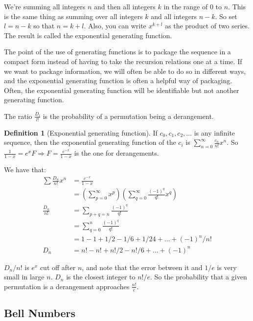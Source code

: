\documentclass[12pt]{article}
\theoremstyle{definition}
\newtheorem{defn}{Definition}
\begin{document}
We're summing all integers $n$ and then all integers $k$ in the range of 0 to
$n$. This is the same thing as summing over all integers $k$ and all integers
$n-k$. So set $l = n-k$ so that $n = k+l$. Also, you can write $x^{k + l}$ as
the product of two series. The result is called the exponential generating
function.

The point of the use of generating functions is to package the sequence in a
compact form instead of having to take the recursion relations one at a time.
If we want to package information, we will often be able to do so in different
ways, and the exponential generating function is often a helpful way of
packaging. Often, the exponential generating function will be identifiable but
not another generating function.

The ratio $\frac{D_l}{ l!}$ is the probability of a permutation being a
derangement. 

\begin{defn}[Exponential generating function]
    If $c_0, c_1, c_2, \ldots$ is any infinite sequence, then the exponential
    generating function of the $c_i$ is $\sum_{n=0}^\infty \frac{c_n}{n!}x^n$.
    So $\frac{1}{1-x} = e^x F \Rightarrow F = \frac{e^{-x}}{1-x}$ is the one
    for derangements.
\end{defn}

We have that:
\begin{align*}
    \sum \frac{D_n}{n!} x^n &= \frac{e^{-x}}{1-x} \\
    &= \left(\sum_{p=0}^\infty x^p\right)\left(\sum_{q=0}^\infty
    \frac{(-1)^q}{q!}x^q\right) \\
    \frac{D_n}{n!} &=  \sum_{p+q=n} \frac{(-1)^q}{q!} \\
    &=  \sum_{q=0}^n \frac{(-1)^q}{q!} \\
    &= 1 -1 + 1/2 - 1/6 + 1/24 + \ldots + (-1)^n/n! \\
    D_n &= n! - n! + n!/2 - n!/6 + \ldots + (-1)^n
\end{align*}

$D_n/n!$ is $e^x$ cut off after $n$, and note that the error between it and
$1/e$ is very small in large $n$. $D_n$ is the closest integer to $n!/e$. So
the probability that a given permutation is a derangement approaches
$\frac{n!}{e}$.

\subsection{Bell Numbers}
\end{document}
